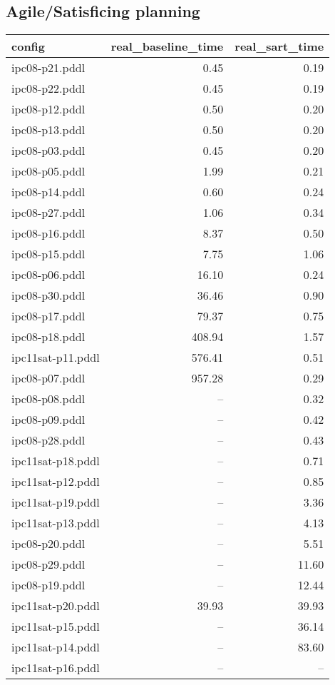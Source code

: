 \documentclass{article}
\begin{document}
                    \subsection*{Agile/Satisficing planning}
                    
                            \begin{center}
                            \scriptsize
                            \begin{tabular}{@{}l|r|r@{}}
                            config & real\_baseline\_time & real\_sart\_time\\\midrule
                             ipc08-p21.pddl&0.45&0.19\\
 ipc08-p22.pddl&0.45&0.19\\
 ipc08-p12.pddl&0.50&0.20\\
 ipc08-p13.pddl&0.50&0.20\\
 ipc08-p03.pddl&0.45&0.20\\
 ipc08-p05.pddl&1.99&0.21\\
 ipc08-p14.pddl&0.60&0.24\\
 ipc08-p27.pddl&1.06&0.34\\
 ipc08-p16.pddl&8.37&0.50\\
 ipc08-p15.pddl&7.75&1.06\\
 ipc08-p06.pddl&16.10&0.24\\
 ipc08-p30.pddl&36.46&0.90\\
 ipc08-p17.pddl&79.37&0.75\\
 ipc08-p18.pddl&408.94&1.57\\
 ipc11sat-p11.pddl&576.41&0.51\\
 ipc08-p07.pddl&957.28&0.29\\
 ipc08-p08.pddl&--&0.32\\
 ipc08-p09.pddl&--&0.42\\
 ipc08-p28.pddl&--&0.43\\
 ipc11sat-p18.pddl&--&0.71\\
 ipc11sat-p12.pddl&--&0.85\\
 ipc11sat-p19.pddl&--&3.36\\
 ipc11sat-p13.pddl&--&4.13\\
 ipc08-p20.pddl&--&5.51\\
 ipc08-p29.pddl&--&11.60\\
 ipc08-p19.pddl&--&12.44\\
 ipc11sat-p20.pddl&39.93&39.93\\
 ipc11sat-p15.pddl&--&36.14\\
 ipc11sat-p14.pddl&--&83.60\\
 ipc11sat-p16.pddl&--&--
                            \end{tabular}
                            \end{center}
                    
\end{document}
